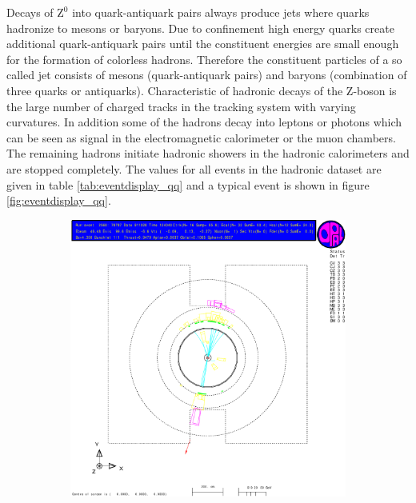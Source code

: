 \documentclass[11pt, a4paper]{article}
\numberwithin{equation}{section}
\begin{document}
Decays of $\mathrm{Z}^0$ into quark-antiquark pairs always produce jets where quarks hadronize to mesons or baryons.
Due to confinement high energy quarks create additional quark-antiquark pairs until the constituent energies are small enough for the formation of colorless hadrons.
Therefore the constituent particles of a so called jet consists of mesons (quark-antiquark pairs) and baryons (combination of three quarks or antiquarks).
Characteristic of hadronic decays of the Z-boson is the large number of charged tracks in the tracking system with varying curvatures.
In addition some of the hadrons decay into leptons or photons which can be seen as signal in the electromagnetic calorimeter or the muon chambers.
The remaining hadrons initiate hadronic showers in the hadronic calorimeters and are stopped completely.
The values for all events in the hadronic dataset are given in table \ref{tab:eventdisplay_qq} and a typical event is shown in figure \ref{fig:eventdisplay_qq}.
\begin{figure}[h]
	\centering
	\begin{subfigure}{\textwidth}
		\centering
		\includegraphics[width=.9\textwidth]{./data/tag1/qq_pics/cropped/qq_04}
	\end{subfigure}
\end{figure}
\end{document}
